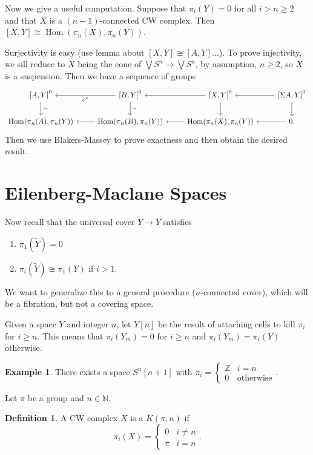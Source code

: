 \documentclass[leqno, openany]{memoir}
\theoremstyle{definition}
\newtheorem{defn}[thm]{Definition}
\newtheorem{exm}[thm]{Example}
\theoremstyle{remark}
\theoremstyle{plain}
\theoremstyle{definition}
\theoremstyle{remark}
\newcommand{\N}{\mathbb{N}}
\newcommand{\Z}{\mathbb{Z}}
\newcommand{\wt}[1]{\widetilde{#1}}
\DeclareMathOperator{\Hom}{Hom}
\begin{document}
Now we give a useful computation. Suppose that $\pi_i(Y) = 0$ for all $i > n \geq 2$ and that $X$ is a $(n-1)$-connected CW complex. Then $[X,Y] \cong \Hom(\pi_n(X), \pi_n(Y))$.

Surjectivity is easy (use lemma about $[X,Y] \cong [A,Y] \ldots$). To prove injectivity, we sill reduce to $X$ being the cone of $\bigvee S^n \to \bigvee S^n$, by assumption, $n \geq 2$, so $X$ is a suspension. Then we have a sequence of groups
\begin{equation*}
\begin{tikzcd}
    { [A,Y] }^0 \arrow{d}{\sim} & { [B,Y] }^0 \arrow{l}{\phi^*} \arrow{d}{\sim} & { [X,Y] }^0 \arrow{d} \arrow{l} & { [\Sigma A, Y] }^0 \arrow{l} \arrow{d} \\
    \Hom(\pi_n(A), \pi_n(Y)) & \Hom(\pi_n(B), \pi_n(Y)) \arrow{l} & \Hom(\pi_n(X), \pi_n(Y)) \arrow{l} & 0. \arrow{l}
\end{tikzcd}
\end{equation*}
Then we use Blakers-Massey to prove exactness and then obtain the desired result.

\section{Eilenberg-Maclane Spaces}%
\label{sec:killing_homotopy_groups}

Now recall that the universal cover $\wt{Y} \to Y$ satisfies 
\begin{enumerate}
    \item $\pi_1(\wt{Y}) = 0$
    \item $\pi_i(\wt{Y}) \cong \pi_1(Y)$ if $i > 1$.
\end{enumerate}
We want to generalize this to a general procedure ($n$-connected cover), which will be a fibration, but not a covering space.

Given a space $Y$ and integer $n$, let $Y[n]$ be the result of attaching cells to kill $\pi_i$ for $i \geq n$. This means that $\pi_i(Y_m) = 0$ for $i \geq n$ and $\pi_i(Y_m) = \pi_i(Y)$ otherwise.

\begin{exm}
    There exists a space $S^n[n+1]$ with $\pi_i = \begin{cases}
        \Z & i = n \\
        0 & \text{otherwise}
    \end{cases}$.
\end{exm}

Let $\pi$ be a group and $n \in \N$. 
\begin{defn}
    A CW complex $X$ is a $K(\pi, n)$ if
    \[ \pi_i(X) = \begin{cases}
        0 & i \neq n \\
        \pi & i = n
    \end{cases}. \]
\end{defn}
\end{document}
